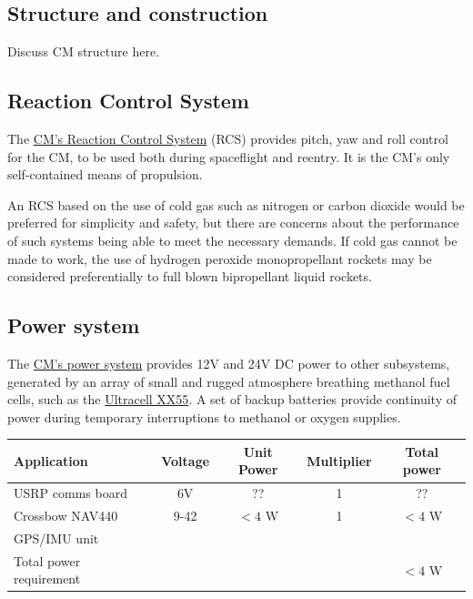 \documentclass{report}
\begin{document}
\subsection{Structure and construction}

Discuss CM structure here.

\subsection{Reaction Control System}

The \href{http://cstart.org/wiki/CLLARE_CM_Reaction_Control_System}{CM's Reaction Control System} (RCS) provides pitch, yaw and roll control for the CM, to be used both during spaceflight and reentry. It is the CM's only self-contained means of propulsion.

An RCS based on the use of cold gas such as nitrogen or carbon dioxide would be preferred for simplicity and safety, but there are concerns about the performance of such systems being able to meet the necessary demands.  If cold gas cannot be made to work, the use of hydrogen peroxide monopropellant rockets may be considered preferentially to full blown bipropellant liquid rockets.

\subsection{Power system}

The \href{http://cstart.org/wiki/CLLARE_CM_Power_System}{CM's power system} provides 12V and 24V DC power to other subsystems, generated by an array of small and rugged atmosphere breathing methanol fuel cells, such as the \href{http://www.ultracellpower.com/assets/XX55_Data_Sheet_01-27-2009.pdf}{Ultracell XX55}.  A set of backup batteries provide continuity of power during temporary interruptions to methanol or oxygen supplies.

\begin{tabular}{ | l | c | c | c | c | }
\hline
Application & Voltage & Unit Power & Multiplier & Total power \\
\hline
\hline
USRP comms board & 6V & ?? & 1 & ?? \\
\hline
Crossbow NAV440 & 9-42 & $<4$ W & 1 & $<4$ W \\
GPS/IMU unit & & & & \\
\hline
\hline
Total power requirement & & & & $<4$ W \\
\hline
\end{tabular}
\end{document}
